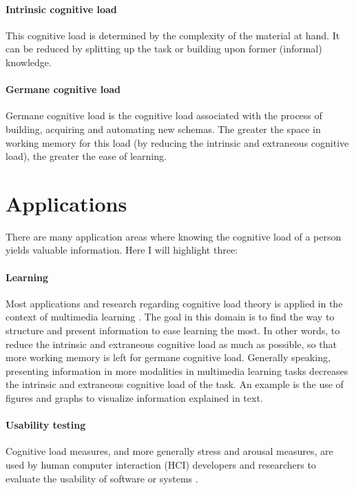 \documentclass[11pt,leqno,a4paper]{report} %
\begin{document}
\paragraph{Intrinsic cognitive load}
This cognitive load is determined by the complexity of the material at hand. It can be reduced by splitting up the task or building upon former (informal) knowledge.

\paragraph{Germane cognitive load}
Germane cognitive load is the cognitive load associated with the process of building, acquiring and automating new schemas. The greater the space in working memory for this load (by reducing the intrinsic and extraneous cognitive load), the greater the ease of learning.

\section{Applications}
There are many application areas where knowing the cognitive load of a person yields valuable information. Here I will highlight three:

\paragraph{Learning}
Most applications and research regarding cognitive load theory is applied in the context of multimedia learning \citep{brunken2003direct}. The goal in this domain is to find the way to structure and present information to ease learning the most. In other words, to reduce the intrinsic and extraneous cognitive load as much as possible, so that more working memory is left for germane cognitive load. Generally speaking, presenting information in more modalities in multimedia learning tasks decreases the intrinsic and extraneous cognitive load of the task. An example is the use of figures and graphs to visualize information explained in text.

\paragraph{Usability testing}
Cognitive load measures, and more generally stress and arousal measures, are used by human computer interaction (HCI) developers and researchers to evaluate the usability of software or systems \citep{Jacob2003} \citep{Schmutz2009}.
\end{document}
